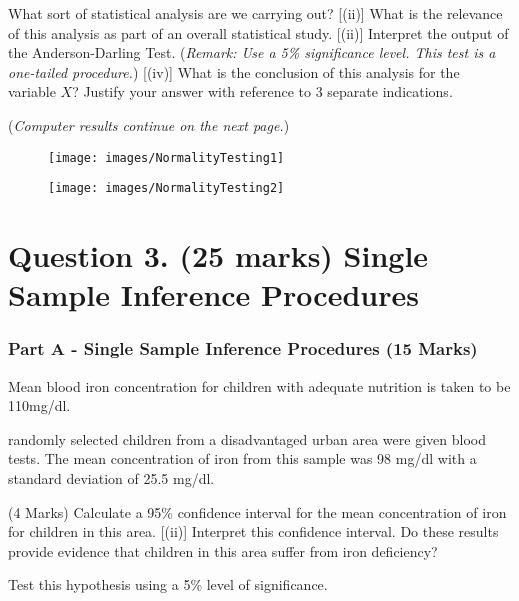\begin{itemize}
[(i)]  What sort of statistical analysis are we carrying out? 
[(ii)]  What is the relevance of this analysis as part of an overall statistical study.
[(ii)]  Interpret the output of the Anderson-Darling Test. (\textit{Remark: Use a 5\% significance level. This test is a one-tailed procedure.})
[(iv)]  What is the conclusion of this analysis for the variable $X$? Justify your answer with reference to 3 separate indications. 
	
\end{itemize}
\noindent (\textit{Computer results continue on the next page.})


\begin{figure}[h!]
	\centering
	\texttt{[image: images/NormalityTesting1]}
\end{figure}
\begin{figure}[h!]
	\centering
	\texttt{[image: images/NormalityTesting2]}
\end{figure}

\newpage






\section*{Question 3. (25 marks) Single Sample Inference Procedures }
\subsubsection*{Part A - Single Sample Inference Procedures (15 Marks)}
Mean blood iron concentration for children with adequate nutrition is taken to be 110mg/dl. \\ \smallskip


 randomly selected children from a disadvantaged urban area were given blood tests. The mean concentration of iron from this sample was 98 mg/dl with a standard deviation of 25.5 mg/dl.
\begin{itemize}
[(i)] (4 Marks) Calculate a 95\% confidence interval for the mean concentration of iron for children in this area. 
[(ii)] Interpret this confidence interval.  Do these results provide evidence that children in this area suffer from iron deficiency? 
\end{itemize}
\medskip
Test this hypothesis using a 5\% level of significance. 

